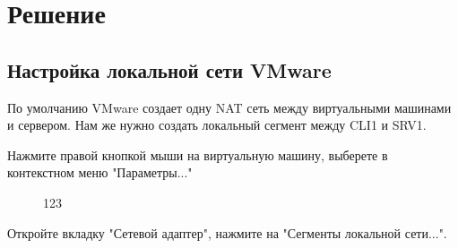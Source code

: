 \documentclass[a4paper, 12pt]{report}
\begin{document}
	\clearpage
	
	\section{Решение}
	
	\subsection{Настройка локальной сети VMware}
	
	По умолчанию VMware создает одну NAT сеть между виртуальными машинами и сервером. Нам же нужно создать локальный сегмент между CLI1 и SRV1.
	
	Нажмите правой кнопкой мыши на виртуальную машину, выберете в контекстном меню "Параметры..."
	
	\begin{figure}[h]
		\caption{123}
		\label{fig:image}
	\end{figure}

	\clearpage

	Откройте вкладку "Сетевой адаптер", нажмите на "Сегменты локальной сети...".
\end{document}
